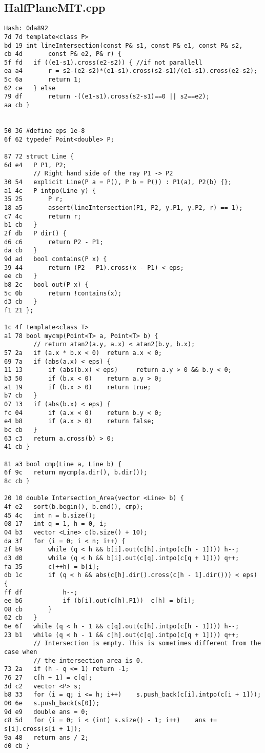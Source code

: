 \documentclass[11pt, a4paper, twoside]{article}
\begin{document}
\subsection{HalfPlaneMIT.cpp}
\begin{lstlisting}
Hash: 0da892
7d 7d template<class P>
bd 19 int lineIntersection(const P& s1, const P& e1, const P& s2,
cb 4d 		const P& e2, P& r) {
5f fd 	if ((e1-s1).cross(e2-s2)) { //if not parallell
ea a4 		r = s2-(e2-s2)*(e1-s1).cross(s2-s1)/(e1-s1).cross(e2-s2);
5c 6a 		return 1;
62 ce 	} else
79 df 		return -((e1-s1).cross(s2-s1)==0 || s2==e2);
aa cb }
 
 
50 36 #define eps 1e-8
6f 62 typedef Point<double> P;
 
87 72 struct Line {
6d e4 	P P1, P2;
      	// Right hand side of the ray P1 -> P2
30 54 	explicit Line(P a = P(), P b = P()) : P1(a), P2(b) {};
a1 4c 	P intpo(Line y) {
35 25 		P r;
18 a5 		assert(lineIntersection(P1, P2, y.P1, y.P2, r) == 1);
c7 4c 		return r;
b1 cb 	}
2f db 	P dir() {
d6 c6 		return P2 - P1;
da cb 	}
9d ad 	bool contains(P x) {
39 44 		return (P2 - P1).cross(x - P1) < eps;
ee cb 	}
b8 2c 	bool out(P x) {
5c 0b 		return !contains(x);
d3 cb 	}
f1 21 }; 
 
1c 4f template<class T>
a1 78 bool mycmp(Point<T> a, Point<T> b) {
      	// return atan2(a.y, a.x) < atan2(b.y, b.x);
57 2a 	if (a.x * b.x < 0)	return a.x < 0;
69 7a 	if (abs(a.x) < eps) {
11 13 		if (abs(b.x) < eps) 	return a.y > 0 && b.y < 0;
b3 50 		if (b.x < 0)	return a.y > 0;
a1 19 		if (b.x > 0)	return true;
b7 cb 	}
07 13 	if (abs(b.x) < eps) {
fc 04 		if (a.x < 0)	return b.y < 0;
e4 b8 		if (a.x > 0)	return false;
bc cb 	}
63 c3 	return a.cross(b) > 0;
41 cb }
 
81 a3 bool cmp(Line a, Line b) {
6f 9c 	return mycmp(a.dir(), b.dir());
8c cb }
 
20 10 double Intersection_Area(vector <Line> b) {
4f e2 	sort(b.begin(), b.end(), cmp);
45 4c 	int n = b.size();
08 17 	int q = 1, h = 0, i;
04 b3 	vector <Line> c(b.size() + 10);
da 3f 	for (i = 0; i < n; i++) {
2f b9 		while (q < h && b[i].out(c[h].intpo(c[h - 1])))	h--;
d3 d0 		while (q < h && b[i].out(c[q].intpo(c[q + 1])))	q++;
fa 35 		c[++h] = b[i];
db 1c 		if (q < h && abs(c[h].dir().cross(c[h - 1].dir())) < eps) {
ff df 			h--;
ee b6 			if (b[i].out(c[h].P1))	c[h] = b[i];
08 cb 		}
62 cb 	}
6e 6f 	while (q < h - 1 && c[q].out(c[h].intpo(c[h - 1])))	h--;
23 b1 	while (q < h - 1 && c[h].out(c[q].intpo(c[q + 1])))	q++;
      	// Intersection is empty. This is sometimes different from the case when
      	// the intersection area is 0. 
73 2a 	if (h - q <= 1)	return -1;
76 27 	c[h + 1] = c[q];
3d c2 	vector <P> s;
b8 33 	for (i = q; i <= h; i++)	s.push_back(c[i].intpo(c[i + 1]));
00 6e 	s.push_back(s[0]);
9d e9 	double ans = 0;
c8 5d 	for (i = 0; i < (int) s.size() - 1; i++)	ans += s[i].cross(s[i + 1]);
9a 48 	return ans / 2;
d0 cb }
 

\end{lstlisting}
\end{document}

